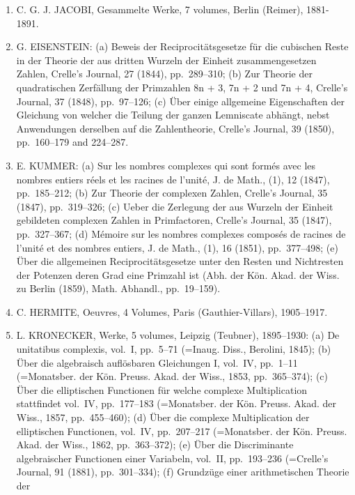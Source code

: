 \begin{enumerate}
\def\labelenumi{\arabic{enumi}.}
\setcounter{enumi}{4}
\item
  C. G. J. JACOBI, Gesammelte Werke, 7 volumes, Berlin (Reimer), 1881-1891.
\item
  G. EISENSTEIN: (a) Beweis der Reciprocitätsgesetze für die cubischen Reste in der Theorie der aus dritten Wurzeln der Einheit zusammengesetzen Zahlen, Crelle's Journal, 27 (1844), pp.~289--310; (b) Zur Theorie der quadratischen Zerfällung der Primzahlen 8n + 3, 7n + 2 und 7n + 4, Crelle's Journal, 37 (1848), pp.~97--126; (c) Über einige allgemeine Eigenschaften der Gleichung von welcher die Teilung der ganzen Lemniscate abhängt, nebst Anwendungen derselben auf die Zahlentheorie, Crelle's Journal, 39 (1850), pp.~160--179 and 224--287.
\item
  E. KUMMER: (a) Sur les nombres complexes qui sont formés avec les nombres entiers réels et les racines de l'unité, J. de Math., (1), 12 (1847), pp.~185--212; (b) Zur Theorie der complexen Zahlen, Crelle's Journal, 35 (1847), pp.~319--326; (c) Ueber die Zerlegung der aus Wurzeln der Einheit gebildeten complexen Zahlen in Primfactoren, Crelle's Journal, 35 (1847), pp.~327--367; (d) Mémoire sur les nombres complexes composés de racines de l'unité et des nombres entiers, J. de Math., (1), 16 (1851), pp.~377--498; (e) Über die allgemeinen Reciprocitätsgesetze unter den Resten und Nichtresten der Potenzen deren Grad eine Primzahl ist (Abh. der Kön. Akad. der Wiss. zu Berlin (1859), Math. Abhandl., pp.~19--159).
\item
  C. HERMITE, Oeuvres, 4 Volumes, Paris (Gauthier-Villars), 1905--1917.
\item
  L. KRONECKER, Werke, 5 volumes, Leipzig (Teubner), 1895--1930: (a) De unitatibus complexis, vol.~I, pp.~5--71 (=Inaug. Diss., Berolini, 1845); (b) Über die algebraisch auflösbaren Gleichungen I, vol.~IV, pp.~1--11 (=Monatsber. der Kön. Preuss. Akad. der Wiss., 1853, pp.~365--374); (c) Über die elliptischen Functionen für welche complexe Multiplication stattfindet vol.~IV, pp.~177--183 (=Monatsber. der Kön. Preuss. Akad. der Wiss., 1857, pp.~455--460); (d) Über die complexe Multiplication der elliptischen Functionen, vol.~IV, pp.~207--217 (=Monatsber. der Kön. Preuss. Akad. der Wiss., 1862, pp.~363--372); (e) Über die Discriminante algebraischer Functionen einer Variabeln, vol.~II, pp.~193--236 (=Crelle's Journal, 91 (1881), pp.~301--334); (f) Grundzüge einer arithmetischen Theorie der
\end{enumerate}

